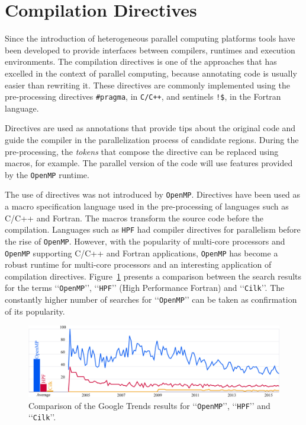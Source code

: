\section{Compilation Directives}
\label{sec:directives}

Since the introduction of heterogeneous parallel computing platforms tools have been developed to provide interfaces between compilers, runtimes and execution environments. The compilation directives is one of the approaches that has excelled in the context of parallel computing, because annotating code is usually easier than rewriting it. These directives are commonly implemented using the pre-processing directives \texttt{\#pragma}, in \texttt{C/C++}, and sentinels \texttt{!\$}, in the Fortran language.

Directives are used as annotations that provide tips about the original code and guide the compiler in the parallelization process of candidate regions. During the pre-processing, the \textit{tokens} that compose the directive can be replaced using macros, for example. The parallel version of the code will use features provided by the \texttt{OpenMP} runtime.

The use of directives was not introduced by \texttt{OpenMP}. Directives have been used as a macro specification language used in the pre-processing of languages such as C/C++ and Fortran. The macros transform the source code before the compilation. Languages such as \texttt{HPF} \cite{Richardson96highperformance} \cite{hpf:1997} had compiler directives for parallelism before the rise of \texttt{OpenMP}. However, with the popularity of multi-core processors and \texttt{OpenMP} supporting C/C++ and Fortran applications, \texttt{OpenMP} has become a robust runtime for multi-core processors and an interesting application of compilation directives. Figure~\ref{fig:google:trends:openmp} presents a comparison between the search results for the terms \lq\lq\texttt{OpenMP}\rq\rq{}, \lq\lq\texttt{HPF}\rq\rq{} (High Performance Fortran) and \lq\lq\texttt{Cilk}\rq\rq. The constantly higher number of searches for \lq\lq\texttt{OpenMP}\rq\rq{} can be taken as confirmation of its popularity.

\begin{figure}[htpb]
\centering
\includegraphics[width=1\columnwidth,height=0.35\columnwidth]{figures/google-trends-openmp.pdf}
\caption{Comparison of the Google Trends results for \lq\lq\texttt{OpenMP}\rq\rq, \lq\lq\texttt{HPF}\rq\rq{} and \lq\lq\texttt{Cilk}\rq\rq.}
\label{fig:google:trends:openmp}
\end{figure}

